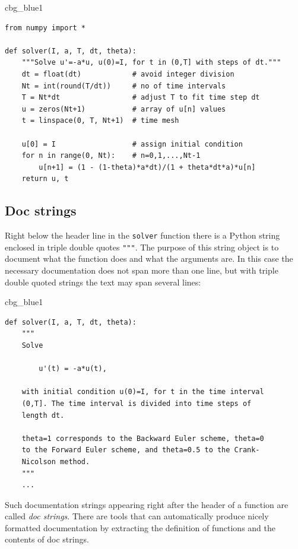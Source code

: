 \documentclass[%
oneside,                 %
final,                   %
10pt]{article}
\newenvironment{_cod_tight}[1]{
   \def\FrameCommand{\colorbox{#1}}
   \FrameRule0.6pt\MakeFramed {\FrameRestore}\vskip3mm}
   {\vskip0mm\endMakeFramed}
\newenvironment{cod}[1]{
\bgroup\rmfamily
\fboxsep=0mm\relax
\begin{_cod_tight}{#1}
\list{}{\parsep=-2mm\parskip=0mm\topsep=0pt\leftmargin=2mm
\rightmargin=2\leftmargin\leftmargin=4pt\relax}
\item\relax}
{\endlist\end{_cod_tight}\egroup}
\begin{document}
\begin{cod}{cbg_blue1}\begin{Verbatim}[numbers=none,fontsize=\fontsize{9pt}{9pt},baselinestretch=0.95,xleftmargin=2mm]
from numpy import *

def solver(I, a, T, dt, theta):
    """Solve u'=-a*u, u(0)=I, for t in (0,T] with steps of dt."""
    dt = float(dt)            # avoid integer division
    Nt = int(round(T/dt))     # no of time intervals
    T = Nt*dt                 # adjust T to fit time step dt
    u = zeros(Nt+1)           # array of u[n] values
    t = linspace(0, T, Nt+1)  # time mesh

    u[0] = I                  # assign initial condition
    for n in range(0, Nt):    # n=0,1,...,Nt-1
        u[n+1] = (1 - (1-theta)*a*dt)/(1 + theta*dt*a)*u[n]
    return u, t
\end{Verbatim}
\end{cod}
\noindent


\subsection{Doc strings}


Right below the header line in the \texttt{solver} function there is a
Python string enclosed in triple double quotes \texttt{"""}.
The purpose of this string object is to document what the function
does and what the arguments are. In this case the necessary
documentation does not span more than one line, but with triple double
quoted strings the text may span several lines:

\begin{cod}{cbg_blue1}\begin{Verbatim}[numbers=none,fontsize=\fontsize{9pt}{9pt},baselinestretch=0.95,xleftmargin=2mm]
def solver(I, a, T, dt, theta):
    """
    Solve

        u'(t) = -a*u(t),

    with initial condition u(0)=I, for t in the time interval
    (0,T]. The time interval is divided into time steps of
    length dt.

    theta=1 corresponds to the Backward Euler scheme, theta=0
    to the Forward Euler scheme, and theta=0.5 to the Crank-
    Nicolson method.
    """
    ...
\end{Verbatim}
\end{cod}
\noindent
Such documentation strings appearing right after the header of
a function are called \emph{doc strings}. There are tools that can automatically
produce nicely formatted documentation by extracting the definition of
functions and the contents of doc strings.
\end{document}
